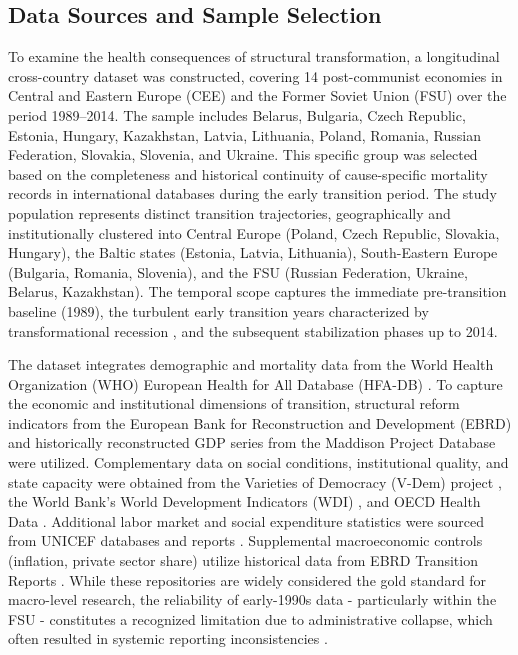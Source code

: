 \documentclass[en,magisterska]{pracamgr}
\begin{document}
\subsection{Data Sources and Sample Selection}

To examine the health consequences of structural transformation, a longitudinal cross-country dataset was constructed, covering 14 post-communist economies 
in Central and Eastern Europe (CEE) and the Former Soviet Union (FSU) over the period 1989--2014. The sample includes Belarus, Bulgaria, Czech Republic, Estonia, 
Hungary, Kazakhstan, Latvia, Lithuania, Poland, Romania, Russian Federation, Slovakia, Slovenia, and Ukraine. This specific group was selected based on the 
completeness and historical continuity of cause-specific mortality records in international databases during the early transition period. The study population 
represents distinct transition trajectories, geographically and institutionally clustered into Central Europe (Poland, Czech Republic, Slovakia, Hungary), the 
Baltic states (Estonia, Latvia, Lithuania), South-Eastern Europe (Bulgaria, Romania, Slovenia), and the FSU (Russian Federation, Ukraine, Belarus, Kazakhstan). 
The temporal scope captures the immediate pre-transition baseline (1989), the turbulent early transition years characterized by transformational recession 
\citep{Cornia2016, Kornai1994}, and the subsequent stabilization phases up to 2014.

The dataset integrates demographic and mortality data from the World Health Organization (WHO) European Health for All Database (HFA-DB) \citep{WHO_HFA}. 
To capture the economic and institutional dimensions of transition, structural reform indicators from the European Bank for Reconstruction and Development (EBRD) 
\citep{EBRD_Indicators} and historically reconstructed GDP series from the Maddison Project Database \citep{MaddisonProject2020} were utilized. Complementary data 
on social conditions, institutional quality, and state capacity were obtained from the Varieties of Democracy (V-Dem) project \citep{VDem_Dataset}, the World Bank’s 
World Development Indicators (WDI) \citep{WB_GovExpenditure}, and OECD Health Data \citep{OECD_Alcohol}. Additional labor market and social expenditure statistics 
were sourced from UNICEF databases and reports \citep{TransMONEE, UNECE2004}. Supplemental macroeconomic controls (inflation, private sector share) utilize historical 
data from EBRD Transition Reports \citep{EBRD1994, EBRD1999, EBRD2004}. While these repositories are widely considered the gold standard for macro-level research, the 
reliability of early-1990s data  -  particularly within the FSU  -  constitutes a recognized limitation due to administrative collapse, which often resulted in systemic 
reporting inconsistencies \citep{Stuckler2009, Gerry2012}.
\end{document}
